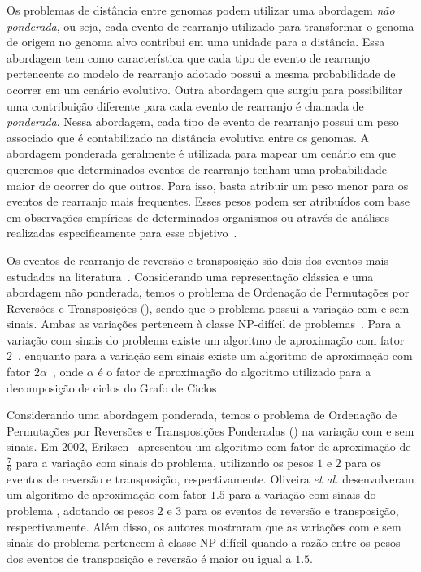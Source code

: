 
Os problemas de distância entre genomas podem utilizar uma abordagem \emph{não ponderada}, ou seja, cada evento de rearranjo utilizado para transformar o genoma de origem no genoma alvo contribui em uma unidade para a distância. Essa abordagem tem como característica que cada tipo de evento de rearranjo pertencente ao modelo de rearranjo adotado possui a mesma probabilidade de ocorrer em um cenário evolutivo. Outra abordagem que surgiu para possibilitar uma contribuição diferente para cada evento de rearranjo é chamada de \emph{ponderada}. Nessa abordagem, cada tipo de evento de rearranjo possui um peso associado que é contabilizado na distância evolutiva entre os genomas. A abordagem ponderada geralmente é utilizada para mapear um cenário em que queremos que determinados eventos de rearranjo tenham uma probabilidade maior de ocorrer do que outros. Para isso, basta atribuir um peso menor para os eventos de rearranjo mais frequentes. Esses pesos podem ser atribuídos com base em observações empíricas de determinados organismos ou através de análises realizadas especificamente para esse objetivo~\cite{2008-bader-etal,2001-eriksen}. 

Os eventos de rearranjo de reversão e transposição são dois dos eventos mais estudados na literatura~\cite{2002-berman-etal,2006-elias-hartman,2022-silva-etal}. Considerando uma representação clássica e uma abordagem não ponderada, temos o problema de Ordenação de Permutações por Reversões e Transposições (\SbRT), sendo que o problema possui a variação com e sem sinais. Ambas as variações pertencem à classe NP-difícil de problemas~\cite{2019b-oliveira-etal}. Para a variação com sinais do problema existe um algoritmo de aproximação com fator 2~\cite{1998-walter-etal}, enquanto para a variação sem sinais existe um algoritmo de aproximação com fator $2\alpha$~\cite{2008-rahman-etal}, onde $\alpha$ é o fator de aproximação do algoritmo utilizado para a decomposição de ciclos do Grafo de Ciclos~\cite{1999a-caprara,2013-chen}.

Considerando uma abordagem ponderada, temos o problema de Ordenação de Permutações por Reversões e Transposições Ponderadas (\SbWRT) na variação com e sem sinais. Em 2002, Eriksen~\cite{2002-eriksen} apresentou um algoritmo com fator de aproximação de $\frac{7}{6}$ para a variação com sinais do problema, utilizando os pesos $1$ e $2$ para os eventos de reversão e transposição, respectivamente. Oliveira \textit{et al.}\cite{2019a-oliveira-etal} desenvolveram um algoritmo de aproximação com fator $1.5$ para a variação com sinais do problema \SbWRT{}, adotando os pesos $2$ e $3$ para os eventos de reversão e transposição, respectivamente. Além disso, os autores mostraram que as variações com e sem sinais do problema \SbWRT{} pertencem à classe NP-difícil quando a razão entre os pesos dos eventos de transposição e reversão é maior ou igual a $1.5$.  

